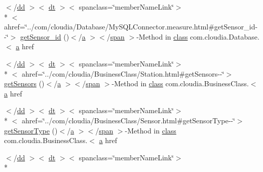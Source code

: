 \begin{DoxyCompactItemize}
\item 
$<$/\hyperlink{stylesheet_8css_a47f4718a86835a7771ec592ece845221}{dd} $>$$<$ \hyperlink{stylesheet_8css_a107565fb4039d33b041380d6e0ea1d80}{dt} $>$$<$ spanclass=\char`\"{}member\-Name\-Link\char`\"{}$>$\\*
$<$ ahref=\char`\"{}../com/cloudia/Database/My\-S\-Q\-L\-Connector.\-measure.\-html\#get\-Sensor\-\_\-id-\/-\/\char`\"{}$>$ \hyperlink{index-7_8html_aefa2e7b92409abde3219d177fefcbd82}{get\-Sensor\-\_\-id} ()$<$/\hyperlink{style_8css_a5e8981582017bb8b84c21f148345d1f7}{a} $>$$<$/\hyperlink{stylesheet_8css_a8343996ebcf16220b04e54659aac31cc}{span} $>$-\/Method in \hyperlink{_tools_8html_acf06f836132665ba8114f5a414c2403f}{class} com.\-cloudia.\-Database.$<$ \hyperlink{style_8css_a5e8981582017bb8b84c21f148345d1f7}{a} href
\item 
$<$/\hyperlink{stylesheet_8css_a47f4718a86835a7771ec592ece845221}{dd} $>$$<$ \hyperlink{stylesheet_8css_a107565fb4039d33b041380d6e0ea1d80}{dt} $>$$<$ spanclass=\char`\"{}member\-Name\-Link\char`\"{}$>$\\*
$<$ ahref=\char`\"{}../com/cloudia/Business\-Class/Station.\-html\#get\-Sensors-\/-\/\char`\"{}$>$ \hyperlink{index-7_8html_a11373a9c6677095aa33226ae57a10bc5}{get\-Sensors} ()$<$/\hyperlink{style_8css_a5e8981582017bb8b84c21f148345d1f7}{a} $>$$<$/\hyperlink{stylesheet_8css_a8343996ebcf16220b04e54659aac31cc}{span} $>$-\/Method in \hyperlink{_tools_8html_acf06f836132665ba8114f5a414c2403f}{class} com.\-cloudia.\-Business\-Class.$<$ \hyperlink{style_8css_a5e8981582017bb8b84c21f148345d1f7}{a} href
\item 
$<$/\hyperlink{stylesheet_8css_a47f4718a86835a7771ec592ece845221}{dd} $>$$<$ \hyperlink{stylesheet_8css_a107565fb4039d33b041380d6e0ea1d80}{dt} $>$$<$ spanclass=\char`\"{}member\-Name\-Link\char`\"{}$>$\\*
$<$ ahref=\char`\"{}../com/cloudia/Business\-Class/Sensor.\-html\#get\-Sensor\-Type-\/-\/\char`\"{}$>$ \hyperlink{index-7_8html_af203f53da4de282cec0a45b7100e7d97}{get\-Sensor\-Type} ()$<$/\hyperlink{style_8css_a5e8981582017bb8b84c21f148345d1f7}{a} $>$$<$/\hyperlink{stylesheet_8css_a8343996ebcf16220b04e54659aac31cc}{span} $>$-\/Method in \hyperlink{_tools_8html_acf06f836132665ba8114f5a414c2403f}{class} com.\-cloudia.\-Business\-Class.$<$ \hyperlink{style_8css_a5e8981582017bb8b84c21f148345d1f7}{a} href
\item 
$<$/\hyperlink{stylesheet_8css_a47f4718a86835a7771ec592ece845221}{dd} $>$$<$ \hyperlink{stylesheet_8css_a107565fb4039d33b041380d6e0ea1d80}{dt} $>$$<$ spanclass=\char`\"{}member\-Name\-Link\char`\"{}$>$\\*
$$
\end{DoxyCompactItemize}
